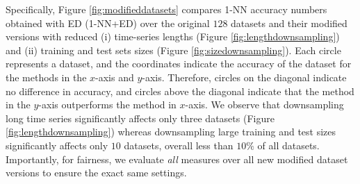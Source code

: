 Specifically, Figure \ref{fig:modifieddatasets} compares 1-NN accuracy numbers obtained with ED (1-NN+ED) over the original $128$ datasets and their modified versions with reduced (i) time-series lengths (Figure \ref{fig:lengthdownsampling}) and (ii) training and test sets sizes (Figure \ref{fig:sizedownsampling}). Each circle represents a dataset, and the coordinates indicate the accuracy of the dataset for the methods in the $x$-axis and $y$-axis. Therefore, circles on the diagonal indicate no difference in accuracy, and circles above the diagonal indicate that the method in the $y$-axis outperforms the method in $x$-axis. We observe that downsampling long time series significantly affects only three datasets (Figure \ref{fig:lengthdownsampling}) whereas downsampling large training and test sizes significantly affects only $10$ datasets, overall less than $10\%$ of all datasets. Importantly, for fairness, we evaluate {\em all} measures over all new modified dataset versions to ensure the exact same settings.

